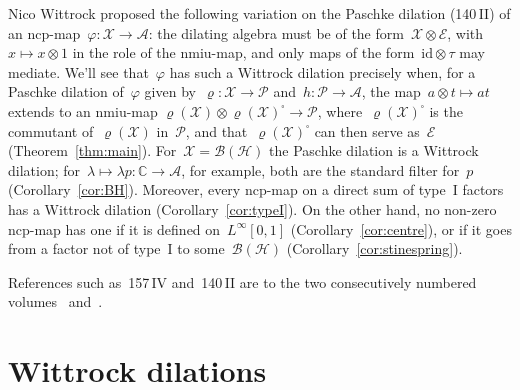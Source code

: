 \documentclass{article}
\theoremstyle{plain}
\theoremstyle{definition}
\begin{document}
\noindent
Nico Wittrock proposed the following variation
    on the Paschke dilation (140\,II)
    of an ncp-map~$\varphi \colon \mathscr{X} \to \mathscr{A}$:
    the dilating algebra must be of the form~$\mathscr{X} \otimes \mathscr{E}$,
    with~$x \mapsto x \otimes 1$ in the role of the nmiu-map,
    and only maps of the form~$\mathrm{id} \otimes \tau$
    may mediate.
We'll see that~$\varphi$ has such a Wittrock dilation
    precisely when,
    for a Paschke dilation of~$\varphi$
    given by~$\varrho \colon \mathscr{X} \to \mathscr{P}$
    and~$h \colon \mathscr{P} \to \mathscr{A}$,
    the map~$a \otimes t \mapsto at$ extends to an nmiu-map
    $\varrho(\mathscr{X}) \otimes \varrho(\mathscr{X})^\square \to \mathscr{P}$,
    where~$\varrho(\mathscr{X})^\square$
    is the commutant of~$\varrho(\mathscr{X})$ in~$\mathscr{P}$,
    and that~$\varrho(\mathscr{X})^\square$ can then serve as~$\mathscr{E}$
    (Theorem~\ref{thm:main}).
For~$\mathscr{X} = \mathscr{B}(\mathscr{H})$
    the Paschke dilation is a Wittrock dilation;
    for~$\lambda \mapsto \lambda p \colon \mathbb{C} \to \mathscr{A}$,
    for example,
    both are the standard filter for~$p$ (Corollary~\ref{cor:BH}).
Moreover,
    every ncp-map on a direct sum of type~I factors
    has a Wittrock dilation (Corollary~\ref{cor:typeI}).
On the other hand,
    no non-zero ncp-map has one
    if it is defined on~$L^\infty[0,1]$ (Corollary~\ref{cor:centre}),
    or if it goes from a factor not of type~I
    to some~$\mathscr{B}(\mathscr{H})$ (Corollary~\ref{cor:stinespring}).

References such as~157\,IV and~140\,II are to the two
consecutively numbered volumes~\cite{bram} and~\cite{bas}.

\section{Wittrock dilations}
\end{document}
